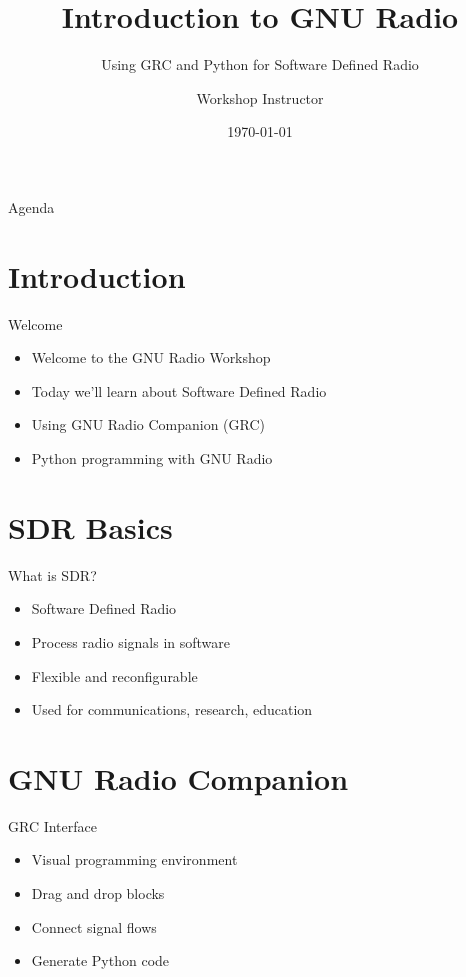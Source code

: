 \documentclass[aspectratio=169,11pt]{beamer}
\title{Introduction to GNU Radio}
\subtitle{Using GRC and Python for Software Defined Radio}
\author{Workshop Instructor}
\institute{GRCon 2025}
\date{\today}
\begin{document}
\begin{frame}
\titlepage
\end{frame}

\begin{frame}{Agenda}
\tableofcontents
\end{frame}

\section{Introduction}
\begin{frame}{Welcome}
\begin{itemize}
    \item Welcome to the GNU Radio Workshop
    \item Today we'll learn about Software Defined Radio
    \item Using GNU Radio Companion (GRC)
    \item Python programming with GNU Radio
\end{itemize}
\end{frame}

\section{SDR Basics}
\begin{frame}{What is SDR?}
\begin{itemize}
    \item Software Defined Radio
    \item Process radio signals in software
    \item Flexible and reconfigurable
    \item Used for communications, research, education
\end{itemize}
\end{frame}

\section{GNU Radio Companion}
\begin{frame}{GRC Interface}
\begin{itemize}
    \item Visual programming environment
    \item Drag and drop blocks
    \item Connect signal flows
    \item Generate Python code
\end{itemize}
\end{frame}
\end{document}
